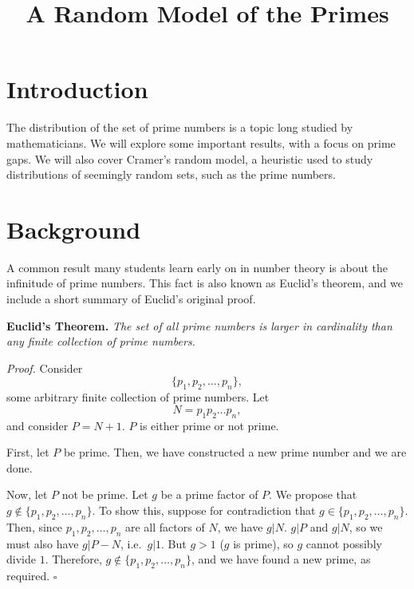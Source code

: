 \documentclass[conference]{IEEEtran}
\begin{document}
\title{A Random Model of the Primes}
\author{
\and
{}
\and
{}
}

\maketitle
\thispagestyle{plain}

\section{Introduction}
The distribution of the set of prime numbers is a topic long studied by mathematicians. We will explore some important results, with a focus on prime gaps. We will also cover Cramer's random model, a heuristic used to study distributions of seemingly random sets, such as the prime numbers. 

\section{Background}

A common result many students learn early on in number theory is about the
infinitude of prime numbers. This fact is also known as Euclid's theorem,
and we include a short summary of Euclid's original proof.

\medskip\noindent
\textbf{Euclid's Theorem.} \textit{The set of all prime numbers is larger
in cardinality than any finite collection of prime numbers.}

\smallskip\noindent
\textit{Proof.} Consider \[\{p_1, p_2, \dots, p_n\},\] some arbitrary finite
collection of
prime numbers. Let \[N = p_1p_2 \dots p_n,\] and consider $P = N + 1$. $P$ is
either prime or not prime.

First, let $P$ be prime. Then, we have constructed a new prime number and
we are done.

Now, let $P$ not be prime. Let $g$ be a prime factor of $P$. We propose that
$g \notin \{p_1, p_2, \dots, p_n\}$. To show this, suppose for contradiction that
$g \in \{p_1, p_2, \dots, p_n\}$. Then, since $p_1, p_2, \dots, p_n$ are all
factors of $N$, we have $g | N$. $g | P$ and $g | N$, so
we must also have $g | P - N$, i.e.\ $g | 1$. But $g > 1$ ($g$ is prime),
so $g$ cannot possibly divide $1$. Therefore,
$g \notin \{p_1, p_2, \dots, p_n\}$, and we have found a new prime, as
required. \hfill$\square$\medskip
\end{document}
